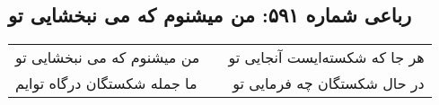 \begin{center}
\section*{رباعی شماره ۵۹۱: من میشنوم که می نبخشایی تو}
\label{sec:sh591}
\begin{longtable}{l p{0.5cm} r}
من میشنوم که می نبخشایی تو
&&
هر جا که شکسته‌ایست آنجایی تو
\\
ما جمله شکستگان درگاه توایم
&&
در حال شکستگان چه فرمایی تو
\\
\end{longtable}
\end{center}

